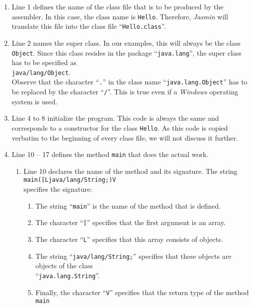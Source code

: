 \begin{enumerate}
\item Line 1 defines the name of the class file that is to be produced by the assembler.
      In this case, the class name is \texttt{Hello}.  Therefore, \textsl{Jasmin} will translate
      this file into the class file ``\texttt{Hello.class}''.
\item Line 2 names the super class.  In our examples, this will always be the class
      \texttt{Object}.  Since this class resides in the package ``\texttt{java.lang}'', the super class
      has to be specified as
      \\[0.2cm]
      \hspace*{1.3cm}
      \texttt{java/lang/Object}.
      \\[0.2cm]
      Observe that the character ``\texttt{.}'' in the class name ``\texttt{java.lang.Object}''
      has to be replaced by the character ``\texttt{/}''.  This is true even if a \textsl{Windows}
      operating system is used.
\item Line 4 to 8 initialize the program.  This code is always the same and corresponds to a
      constructor for the class \texttt{Hello}.  As this code is copied verbatim to the beginning 
      of every class file, we will not discuss it further. 
\item Line 10 -- 17 defines the method \texttt{main} that does the actual work.
  \begin{enumerate}
  \item Line 10 declares the name of the method and its signature.  The string
        \\[0.2cm]
        \hspace*{1.3cm}
        \texttt{main([Ljava/lang/String;)V}
        \\[0.2cm]
        specifies the signature:
        \begin{enumerate}
        \item The string ``\texttt{main}''  is the name of the method that is defined.
        \item The character ``\texttt{[}'' specifies that the first argument is an array.
        \item The character ``\texttt{L}'' specifies that this array consists of objects.
        \item The string ``\texttt{java/lang/String;}'' specifies that these objects are objects of
              the class \\
              ``\texttt{java.lang.String}''.
        \item Finally, the character ``\texttt{V}'' specifies that the return type of the method \texttt{main}

\end{enumerate}
\end{enumerate}
\end{enumerate}
